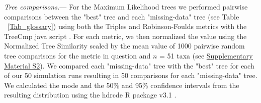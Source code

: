 \documentclass[12pt,letterpaper]{article}
\renewcommand{\subsubsection}[1]{%
\vspace{2ex}
\noindent
\textit{#1.}---}
\begin{document}
\subsubsection{Tree comparisons}
For the Maximum Likelihood trees we performed pairwise comparisons between the "best" tree and each "missing-data" tree (see Table ~\ref{Tab_glossary}) using both the Triples and Robinson-Foulds metrics %
with the TreeCmp java script \citep{Bogdanowicz2012}.
For each metric, we then normalized the value using the Normalized Tree Similarity scaled by the mean value of 1000 pairwise random tree comparisons for the metric in question and $n$ = 51 taxa (see \hyperref[SupplementaryMaterial]{Supplementary Material S2}). %
We compared each "missing-data" tree with the "best" tree for each of our 50 simulation runs
resulting in 50 comparisons for each "missing-data" tree.
We calculated the mode and the 50\% and 95\% confidence intervals from the resulting distribution using the hdrcde R package v3.1 \citep{hdrcde}. %


\end{document}
